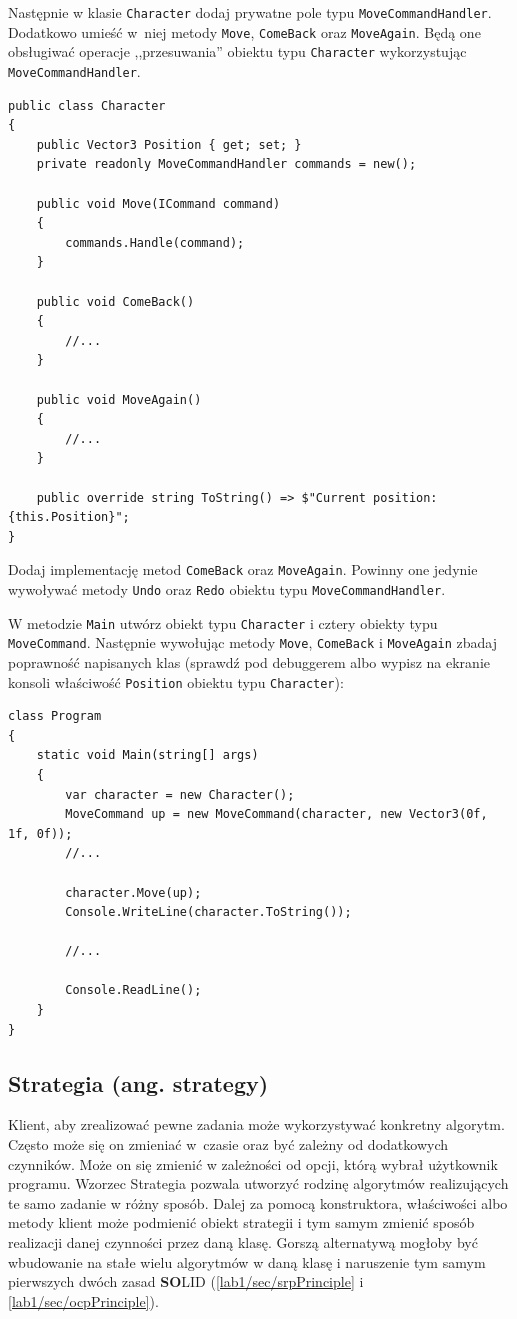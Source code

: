 Następnie w klasie \texttt{Character} dodaj prywatne pole typu \texttt{MoveCommandHandler}. Dodatkowo umieść w~niej metody \texttt{Move}, \texttt{ComeBack} oraz \texttt{MoveAgain}. Będą one obsługiwać operacje ,,przesuwania'' obiektu typu \texttt{Character} wykorzystując \texttt{MoveCommandHandler}.
\begin{lstlisting}
public class Character
{
	public Vector3 Position { get; set; }
	private readonly MoveCommandHandler commands = new();
	
	public void Move(ICommand command)
	{
		commands.Handle(command);
	}
	
	public void ComeBack()
	{
		//...
	}
	
	public void MoveAgain()
	{
		//...
	}
	
	public override string ToString() => $"Current position: {this.Position}";
}
\end{lstlisting}
Dodaj implementację metod \texttt{ComeBack} oraz \texttt{MoveAgain}. Powinny one jedynie wywoływać metody \texttt{Undo} oraz \texttt{Redo} obiektu typu \texttt{MoveCommandHandler}.

W metodzie \texttt{Main} utwórz obiekt typu \texttt{Character} i cztery obiekty typu \texttt{MoveCommand}. Następnie wywołując metody \texttt{Move}, \texttt{ComeBack} i \texttt{MoveAgain} zbadaj poprawność napisanych klas (sprawdź pod debuggerem albo wypisz na ekranie konsoli właściwość \texttt{Position} obiektu typu \texttt{Character}):
\begin{lstlisting}
class Program
{
	static void Main(string[] args)
	{
		var character = new Character();
		MoveCommand up = new MoveCommand(character, new Vector3(0f, 1f, 0f));
		//...
		
		character.Move(up);
		Console.WriteLine(character.ToString());
		
		//...
		
		Console.ReadLine();
	}
}
\end{lstlisting}

\subsection{Strategia (ang. strategy)}\label{lab4/sec/strategy}

Klient, aby zrealizować pewne zadania może wykorzystywać konkretny algorytm. Często może się on zmieniać w~czasie oraz być zależny od dodatkowych czynników. Może on się zmienić w zależności od opcji, którą wybrał użytkownik programu. Wzorzec Strategia pozwala utworzyć rodzinę algorytmów realizujących te samo zadanie w różny sposób. Dalej za pomocą konstruktora, właściwości albo metody klient może podmienić obiekt strategii i tym samym zmienić sposób realizacji danej czynności przez daną klasę. Gorszą alternatywą mogłoby być wbudowanie na stałe wielu algorytmów w daną klasę i naruszenie tym samym pierwszych dwóch zasad \textbf{SO}LID (\ref{lab1/sec/srpPrinciple} i \ref{lab1/sec/ocpPrinciple}).

